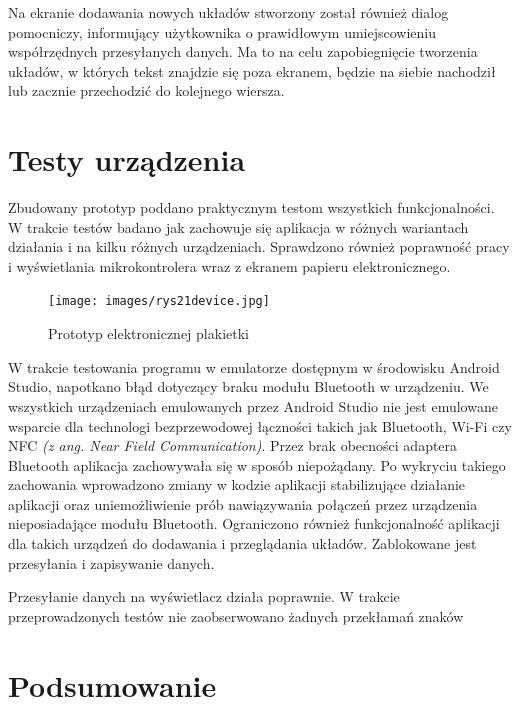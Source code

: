 \documentclass[a4paper,12pt, twoside]{article}
\begin{document}
    	
    	Na ekranie dodawania nowych układów stworzony został również dialog pomocniczy, informujący użytkownika o prawidłowym umiejscowieniu współrzędnych przesyłanych danych. Ma to na celu zapobiegnięcie tworzenia układów, w których tekst znajdzie się poza ekranem, będzie na siebie nachodził lub zacznie przechodzić do kolejnego wiersza.
    	

    	\section{Testy urządzenia}
    	Zbudowany prototyp poddano praktycznym testom wszystkich funkcjonalności. W trakcie testów badano jak zachowuje się aplikacja w różnych wariantach działania i na kilku różnych urządzeniach. Sprawdzono również poprawność pracy i wyświetlania mikrokontrolera wraz z ekranem papieru elektronicznego.
    	
    	\begin{figure}[H]
    	        \centering
    	        \vspace{.5cm}
    			\texttt{[image: images/rys21device.jpg]}
    			\vspace{.5cm}
    		    \caption{Prototyp elektronicznej plakietki}
                \label{fig:device}
    	\end{figure}
    	
    	W trakcie testowania programu w emulatorze dostępnym w środowisku Android Studio, napotkano błąd dotyczący braku modułu Bluetooth w urządzeniu. We wszystkich urządzeniach emulowanych przez Android Studio nie jest emulowane wsparcie dla technologi bezprzewodowej łączności takich jak Bluetooth, Wi-Fi czy NFC \textit{(z ang. Near Field Communication)}. Przez brak obecności adaptera Bluetooth aplikacja zachowywała się w sposób niepożądany. Po wykryciu takiego zachowania wprowadzono zmiany w kodzie aplikacji stabilizujące działanie aplikacji oraz uniemożliwienie prób nawiązywania połączeń przez urządzenia nieposiadające modułu Bluetooth. Ograniczono również funkcjonalność aplikacji dla takich urządzeń do dodawania i przeglądania układów. Zablokowane jest przesyłania i zapisywanie danych.
    	
    	Przesyłanie danych na wyświetlacz działa poprawnie. W trakcie przeprowadzonych testów nie zaobserwowano żadnych przekłamań znaków 
    	
    	
    	
    	
    	
    	\section{Podsumowanie}
    	
\end{document}
